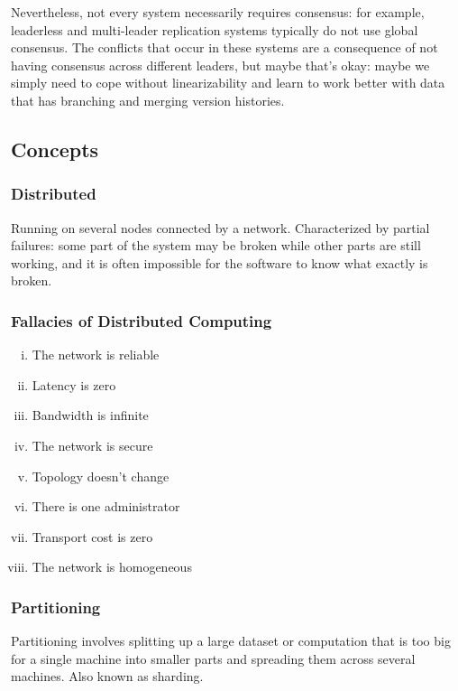 \documentclass{article}
\begin{document}
    Nevertheless, not every system necessarily requires consensus: for example, leaderless and multi-leader replication systems typically do not use global consensus. The conflicts that occur in these systems are a consequence of not having consensus across different leaders, but maybe that’s okay: maybe we simply need to cope without linearizability and learn to work better with data that has branching and merging version histories.

    \subsection{Concepts}
    \subsubsection{Distributed}
    Running on several nodes connected by a network. Characterized by partial failures: some part of the system may be broken  while other parts are still working, and it is often impossible for the software to know what exactly is broken.
    
    \subsubsection{Fallacies of Distributed Computing}
    \begin{multicols}{2}
    \begin{enumerate}[i.]
        \item The network is reliable
        \item Latency is zero
        \item Bandwidth is infinite
        \item The network is secure
        \item Topology doesn't change
        \item There is one administrator
        \item Transport cost is zero
        \item The network is homogeneous
    \end{enumerate}
    \end{multicols}
    
    \subsubsection{Partitioning}
    Partitioning involves splitting up a large dataset or computation that is too big for a single machine into smaller parts and spreading them across several machines. Also known as sharding.
    
\end{document}
